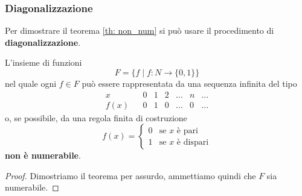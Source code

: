 \subsubsection{Diagonalizzazione}
Per dimostrare il teorema \ref{th: non_num} si pu\`o usare il procedimento di \textbf{diagonalizzazione}.
\begin{theorem}
	L'insieme di funzioni
	\[ F = \{ f \mid f : N \rightarrow \{0, 1\} \} \]
	nel quale ogni $f \in F$ pu\`o essere rappresentata da una sequenza infinita del tipo
	\[
		\begin{matrix}
			x    &  & 0 & 1 & 2 & \dots & n & \dots \\
			f(x) &  & 0 & 1 & 0 & \dots & 0 & \dots
		\end{matrix}
	\]
	o, se possibile, da una regola finita di costruzione
	\[
		f(x) = \begin{cases}
			0 & \text{se } x \text{ \`e pari}    \\
			1 & \text{se } x \text{ \`e dispari}
		\end{cases}
	\]
	\textbf{non \`e numerabile}.

	\begin{proof}
		Dimostriamo il teorema per assurdo, ammettiamo quindi che $F$ sia numerabile.


\end{proof}
\end{theorem}
